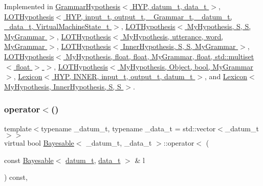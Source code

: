 Implemented in \hyperlink{class_grammar_hypothesis_a55297e7d1dac48158efa012445b93137}{Grammar\+Hypothesis$<$ H\+Y\+P, datum\+\_\+t, data\+\_\+t $>$}, \hyperlink{class_l_o_t_hypothesis_a7c33d51f8d81762b1eca7f86b596236a}{L\+O\+T\+Hypothesis$<$ H\+Y\+P, input\+\_\+t, output\+\_\+t, \+\_\+\+Grammar\+\_\+t, \+\_\+datum\+\_\+t, \+\_\+data\+\_\+t, Virtual\+Machine\+State\+\_\+t $>$}, \hyperlink{class_l_o_t_hypothesis_a7c33d51f8d81762b1eca7f86b596236a}{L\+O\+T\+Hypothesis$<$ My\+Hypothesis, S, S, My\+Grammar $>$}, \hyperlink{class_l_o_t_hypothesis_a7c33d51f8d81762b1eca7f86b596236a}{L\+O\+T\+Hypothesis$<$ My\+Hypothesis, utterance, word, My\+Grammar $>$}, \hyperlink{class_l_o_t_hypothesis_a7c33d51f8d81762b1eca7f86b596236a}{L\+O\+T\+Hypothesis$<$ Inner\+Hypothesis, S, S, My\+Grammar $>$}, \hyperlink{class_l_o_t_hypothesis_a7c33d51f8d81762b1eca7f86b596236a}{L\+O\+T\+Hypothesis$<$ My\+Hypothesis, float, float, My\+Grammar, float, std\+::multiset$<$ float $>$ $>$}, \hyperlink{class_l_o_t_hypothesis_a7c33d51f8d81762b1eca7f86b596236a}{L\+O\+T\+Hypothesis$<$ My\+Hypothesis, Object, bool, My\+Grammar $>$}, \hyperlink{class_lexicon_afbefa510e623ee4a407a1e1e04f42fb2}{Lexicon$<$ H\+Y\+P, I\+N\+N\+E\+R, input\+\_\+t, output\+\_\+t, datum\+\_\+t $>$}, and \hyperlink{class_lexicon_afbefa510e623ee4a407a1e1e04f42fb2}{Lexicon$<$ My\+Hypothesis, Inner\+Hypothesis, S, S $>$}.

\mbox{\label{class_bayesable_ac356e7e5b11c266b8442064186dbe89d}} 
\subsubsection{\texorpdfstring{operator$<$()}{operator<()}}
{\footnotesize\ttfamily template$<$typename \+\_\+datum\+\_\+t, typename \+\_\+data\+\_\+t = std\+::vector$<$\+\_\+datum\+\_\+t$>$$>$ \\
virtual bool \hyperlink{class_bayesable}{Bayesable}$<$ \+\_\+datum\+\_\+t, \+\_\+data\+\_\+t $>$\+::operator$<$ (\begin{DoxyParamCaption}\item[{const \hyperlink{class_bayesable}{Bayesable}$<$ \hyperlink{class_bayesable_a9f1a6c0cd7855550fa10b1a8f13a5867}{datum\+\_\+t}, \hyperlink{class_bayesable_aa2788c4d7718c0a824e1d28c4c98f921}{data\+\_\+t} $>$ \&}]{l }\end{DoxyParamCaption}) const\hspace{0.3cm}{\ttfamily [inline]}, {\ttfamily [virtual]}}

